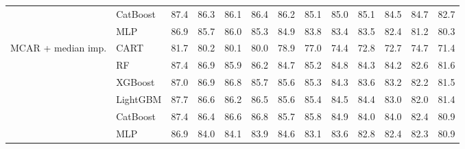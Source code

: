 \begin{table}[p]
\begin{tabular}{@{}llrrrrrrrrrrr@{}}
 & CatBoost & 87.4 & 86.3 & 86.1 & 86.4 & 86.2 & 85.1 & 85.0 & 85.1 & 84.5 & 84.7 & 82.7 \\
 & MLP & 86.9 & 85.7 & 86.0 & 85.3 & 84.9 & 83.8 & 83.4 & 83.5 & 82.4 & 81.2 & 80.3 \\
\midrule
MCAR + median imp. & CART & 81.7 & 80.2 & 80.1 & 80.0 & 78.9 & 77.0 & 74.4 & 72.8 & 72.7 & 74.7 & 71.4 \\
 & RF & 87.4 & 86.9 & 85.9 & 86.2 & 84.7 & 85.2 & 84.8 & 84.3 & 84.2 & 82.6 & 81.6 \\
 & XGBoost & 87.0 & 86.9 & 86.8 & 85.7 & 85.6 & 85.3 & 84.3 & 83.6 & 83.2 & 82.2 & 81.5 \\
 & LightGBM & 87.7 & 86.6 & 86.2 & 86.5 & 85.6 & 85.4 & 84.5 & 84.4 & 83.0 & 82.0 & 81.4 \\
 & CatBoost & 87.4 & 86.4 & 86.6 & 86.8 & 85.7 & 85.8 & 84.9 & 84.0 & 84.0 & 82.4 & 80.9 \\
 & MLP & 86.9 & 84.0 & 84.1 & 83.9 & 84.6 & 83.1 & 83.6 & 82.8 & 82.4 & 82.3 & 80.9 \\
\bottomrule
\end{tabular}
\end{table}

